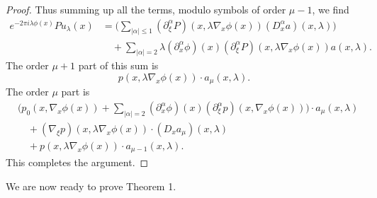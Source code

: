 \documentclass{article}
\theoremstyle{plain}
\theoremstyle{remark}
\theoremstyle{definition}
\begin{document}
\begin{proof}
	Thus summing up all the terms, modulo symbols of order $\mu - 1$, we find
	\begin{align*}
		e^{-2 \pi i \lambda \phi(x)} Pu_\lambda(x) &= \Bigg( \sum_{|\alpha| \leq 1} (\partial_\xi^\alpha P)(x,\lambda \nabla_x \phi(x)) (D^\alpha_x a)(x,\lambda) \Bigg)\\
		&\quad + \sum_{|\alpha| = 2} \lambda (\partial^\alpha_x \phi)(x) (\partial_\xi^\alpha P)(x, \lambda \nabla_x \phi(x)) a(x,\lambda).
	\end{align*}
	The order $\mu + 1$ part of this sum is
	\[ p(x, \lambda \nabla_x \phi(x)) \cdot a_\mu(x,\lambda). \]
	The order $\mu$ part is
	\begin{align*}
		& \Bigg( p_0(x, \nabla_x \phi(x)) + \sum_{|\alpha| = 2} (\partial^\alpha_x \phi)(x) (\partial_\xi^\alpha p)(x, \nabla_x \phi(x)) \Bigg) \cdot a_\mu(x,\lambda)\\
		&\quad + (\nabla_\xi p)(x,\lambda \nabla_x \phi(x)) \cdot (D_x a_\mu)(x,\lambda) \\
		&\quad + p(x,\lambda \nabla_x \phi(x)) \cdot a_{\mu - 1}(x,\lambda).
	\end{align*}
	This completes the argument.
\end{proof}

We are now ready to prove Theorem 1.
\end{document}
